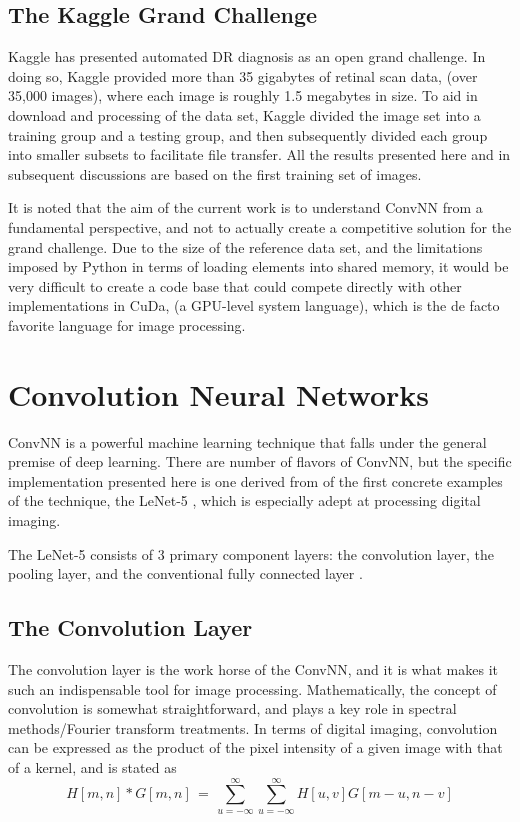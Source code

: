 \documentclass[letterpaper,12pt]{article}
\begin{document}
\subsection{The Kaggle Grand Challenge}

Kaggle has presented automated DR diagnosis as an open grand challenge. In doing so, Kaggle provided more than 35 gigabytes of retinal scan data, (over 35,000 images), where each image is roughly 1.5 megabytes in size. To aid in download and processing of the data set, Kaggle divided the image set into a training group and a testing group, and then subsequently divided each group into smaller subsets to facilitate file transfer. All the results presented here and in subsequent discussions are based on the first training set of images.

It is noted that the aim of the current work is to understand ConvNN from a fundamental perspective, and not to actually create a competitive solution for the grand challenge. Due to the size of the reference data set, and the limitations imposed by Python in terms of loading elements into shared memory, it would be very difficult to create a code base that could compete directly with other implementations in CuDa, (a GPU-level system language), which is the de facto favorite language for image processing.	

\section{Convolution Neural Networks}

ConvNN is a powerful machine learning technique that falls under the general premise of deep learning. There are number of flavors of ConvNN, but the specific implementation presented here is one derived from of the first concrete examples of the technique, the LeNet-5 \cite{LeNet}, which is especially adept at processing digital imaging.

The LeNet-5 consists of 3 primary component layers: the convolution layer, the pooling layer, and the conventional fully connected layer \cite{deep}. 

\subsection{The Convolution Layer}

The convolution layer is the work horse of the ConvNN, and it is what makes it such an indispensable tool for image processing. Mathematically, the concept of convolution is somewhat straightforward, and plays a key role in spectral methods/Fourier transform treatments. In terms of digital imaging, convolution can be expressed as \cite{deep} the product of the pixel intensity of a given image with that of a kernel, and is stated as
\begin{equation}
H[m,n] * G[m,n] \, = \, \sum_{u=- \infty}^{\infty} \sum_{u=- \infty}^{\infty} H[u,v] G[m-u, n-v]
\end{equation}
\end{document}
